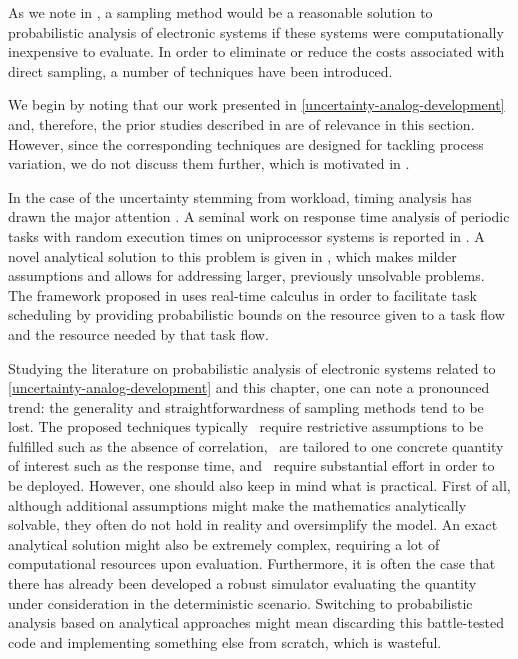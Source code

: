 As we note in , a sampling method would be a reasonable solution to
probabilistic analysis of electronic systems if these systems were
computationally inexpensive to evaluate. In order to eliminate or reduce the
costs associated with direct sampling, a number of techniques have been
introduced.

We begin by noting that our work presented in
\cref{uncertainty-analog-development} and, therefore, the prior studies
described in  are of relevance in this section. However, since
the corresponding techniques are designed for tackling process variation, we do
not discuss them further, which is motivated in .

In the case of the uncertainty stemming from workload, timing analysis has drawn
the major attention \cite{quinton2012}. A seminal work on response time analysis
of periodic tasks with random execution times on uniprocessor systems is
reported in \cite{diaz2002}. A novel analytical solution to this problem is
given in \cite{tanasa2015}, which makes milder assumptions and allows for
addressing larger, previously unsolvable problems. The framework proposed in
\cite{santinelli2011} uses real-time calculus in order to facilitate task
scheduling by providing probabilistic bounds on the resource given to a task
flow and the resource needed by that task flow.

Studying the literature on probabilistic analysis of electronic systems related
to \cref{uncertainty-analog-development} and this chapter, one can note a
pronounced trend: the generality and straightforwardness of sampling methods
tend to be lost. The proposed techniques typically \one~require restrictive
assumptions to be fulfilled such as the absence of correlation, \two~are
tailored to one concrete quantity of interest such as the response time, and
\three~require substantial effort in order to be deployed. However, one should
also keep in mind what is practical. First of all, although additional
assumptions might make the mathematics analytically solvable, they often do not
hold in reality and oversimplify the model. An exact analytical solution might
also be extremely complex, requiring a lot of computational resources upon
evaluation. Furthermore, it is often the case that there has already been
developed a robust simulator evaluating the quantity under consideration in the
deterministic scenario. Switching to probabilistic analysis based on analytical
approaches might mean discarding this battle-tested code and implementing
something else from scratch, which is wasteful.

